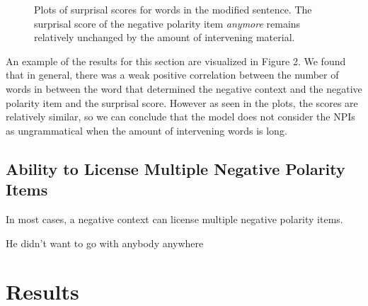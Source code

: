 \documentclass[11pt, round]{article}
\begin{document}
\begin{figure}
    \centering
    \caption{Plots of surprisal scores for words in the modified sentence. The surprisal score of the negative polarity item \textit{anymore} remains relatively unchanged by the amount of intervening material.}
\end{figure}

An example of the results for this section are visualized in Figure 2. We found that in general, there was a weak positive correlation between the number of words in between the word that determined the negative context and the negative polarity item and the surprisal score. However as seen in the plots, the scores are relatively similar, so we can conclude that the model does not consider the NPIs as ungrammatical when the amount of intervening words is long.

\subsection{Ability to License Multiple Negative Polarity Items}
In most cases, a negative context can license multiple negative polarity items.
\begin{exe}
\ex
\begin{xlist}
\ex He didn't want to go with anybody anywhere
\end{xlist}
\end{exe} 

\section{Results}


\end{document}
